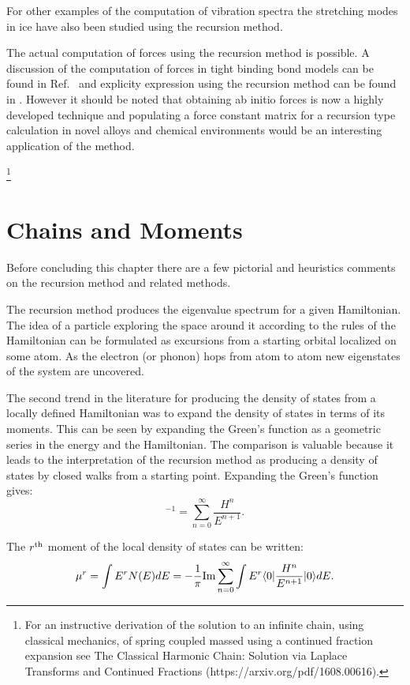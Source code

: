 For other examples of the computation of vibration spectra the stretching modes 
in ice have also been studied using the recursion method\cite{mcgra78,bergren82}.

The actual computation of forces using the recursion method is possible. 
A discussion of the computation of forces in tight binding bond models can be found in
Ref.~\cite{sutton88} and explicity expression using the recursion method can be found in 
\cite{boswarva82, boswarva87}. However it should be noted that obtaining ab initio forces
is now a highly developed technique and populating a force constant matrix for a recursion
type calculation in novel alloys and chemical environments would be an interesting application
of the method.

\footnote{For an instructive derivation of the solution to an infinite 
chain, using classical mechanics, of spring coupled massed using a continued fraction expansion see 
The Classical Harmonic Chain: Solution via Laplace Transforms and Continued Fractions 
(https://arxiv.org/pdf/1608.00616).}

\section{Chains and Moments}
Before concluding this chapter there are a few 
pictorial and heuristics comments on the recursion method
and related methods.

The recursion method produces the eigenvalue spectrum
for a given Hamiltonian. The idea of a particle exploring
the space around it according to the rules of the Hamiltonian
can be formulated as excursions from a starting orbital localized
on some atom. As the electron (or phonon) hops from atom to atom
new eigenstates of the system are uncovered.

The second trend in the literature for producing the density of states
from a locally defined Hamiltonian was to expand the density of
states in terms of its moments. This can be seen by expanding the
Green's function as a geometric series in the energy and the Hamiltonian.
The comparison is valuable because it leads to the interpretation of 
the recursion method as producing a density of states by closed walks
from a starting point.\cite{ducastelle70} 
Expanding the Green's function gives:
%
\begin{equation}
[E-H]^{-1} = \sum_{n=0}^{\infty} \frac{H^{n}}{E^{n+1}}.
\end{equation}
%

The $r^{\rm th}$ moment of the local density of states can be written:
%
\begin{equation}
\mu^{r} = \int E^{r}N(E)dE = -\frac{1}{\pi}{\rm Im}\sum_{n=0}^{\infty}\int E^{r}\langle 0|\frac{H^{n}}{E^{n+1}}|0\rangle dE.
\end{equation}
%

